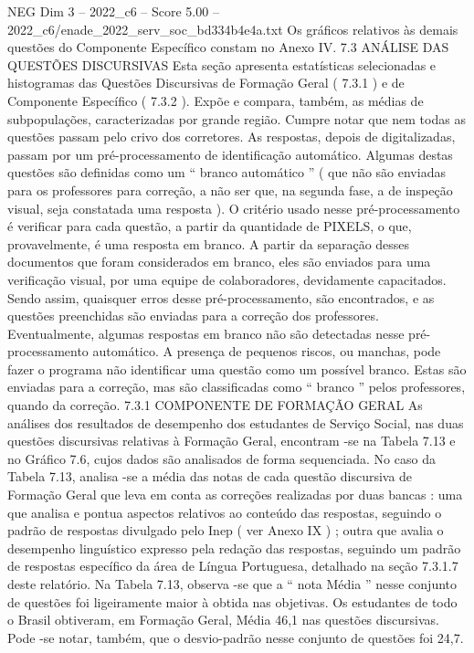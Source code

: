 \begin{textsample}{NEG Dim 3 – 2022\_c6 – Score 5.00 – 2022\_c6/enade\_2022\_serv\_soc\_bd334b4e4a.txt}
Os gráficos relativos às demais questões do Componente Específico constam no Anexo IV. 7.3 ANÁLISE DAS QUESTÕES DISCURSIVAS Esta seção apresenta estatísticas selecionadas e histogramas das Questões Discursivas de Formação Geral ( 7.3.1 ) e de Componente Específico ( 7.3.2 ).
Expõe e compara, também, as médias de subpopulações, caracterizadas por grande região.
Cumpre notar que nem todas as questões passam pelo crivo dos corretores.
As respostas, depois de digitalizadas, passam por um pré-processamento de identificação automático.
Algumas destas questões são definidas como um “ branco automático ” ( que não são enviadas para os professores para correção, a não ser que, na segunda fase, a de inspeção visual, seja constatada uma resposta ).
O critério usado nesse pré-processamento é verificar para cada questão, a partir da quantidade de PIXELS, o que, provavelmente, é uma resposta em branco.
A partir da separação desses documentos que foram considerados em branco, eles são enviados para uma verificação visual, por uma equipe de colaboradores, devidamente capacitados.
Sendo assim, quaisquer erros desse pré-processamento, são encontrados, e as questões preenchidas são enviadas para a correção dos professores.
Eventualmente, algumas respostas em branco não são detectadas nesse pré-processamento automático.
A presença de pequenos riscos, ou manchas, pode fazer o programa não identificar uma questão como um possível branco.
Estas são enviadas para a correção, mas são classificadas como “ branco ” pelos professores, quando da correção. 7.3.1 COMPONENTE DE FORMAÇÃO GERAL As análises dos resultados de desempenho dos estudantes de Serviço Social, nas duas questões discursivas relativas à Formação Geral, encontram -se na Tabela 7.13 e no Gráfico 7.6, cujos dados são analisados de forma sequenciada.
No caso da Tabela 7.13, analisa -se a média das notas de cada questão discursiva de Formação Geral que leva em conta as correções realizadas por duas bancas : uma que analisa e pontua aspectos relativos ao conteúdo das respostas, seguindo o padrão de respostas divulgado pelo Inep ( ver Anexo IX ) ; outra que avalia o desempenho linguístico expresso pela redação das respostas, seguindo um padrão de respostas específico da área de Língua Portuguesa, detalhado na seção 7.3.1.7 deste relatório.
Na Tabela 7.13, observa -se que a “ nota Média ” nesse conjunto de questões foi ligeiramente maior à obtida nas objetivas.
Os estudantes de todo o Brasil obtiveram, em Formação Geral, Média 46,1 nas questões discursivas.
Pode -se notar, também, que o desvio-padrão nesse conjunto de questões foi 24,7.

\end{textsample}
